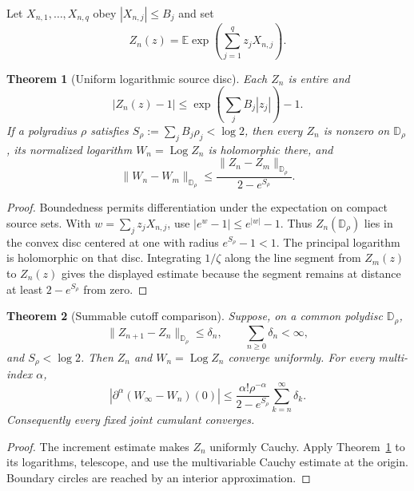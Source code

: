 \documentclass[11pt]{article}
\newtheorem{theorem}{Theorem}
\theoremstyle{definition}
\theoremstyle{remark}
\newcommand{\D}{\mathbb D}
\newcommand{\E}{\mathbb E}
\newcommand{\Log}{\operatorname{Log}}
\begin{document}
Let $X_{n,1},\ldots,X_{n,q}$ obey $|X_{n,j}|\le B_j$ and set
\[
 Z_n(z)=\E\exp\left(\sum_{j=1}^qz_jX_{n,j}\right).
\]

\begin{theorem}[Uniform logarithmic source disc]\label{thm:bounded}
Each $Z_n$ is entire and
\[
 |Z_n(z)-1|\le
 \exp\left(\sum_jB_j|z_j|\right)-1.
\]
If a polyradius $\rho$ satisfies $S_\rho:=\sum_jB_j\rho_j<\log2$, then every
$Z_n$ is nonzero on $\D_\rho$, its normalized logarithm $W_n=\Log Z_n$ is
holomorphic there, and
\[
 \lVert W_n-W_m\rVert_{\D_\rho}
 \le\frac{\lVert Z_n-Z_m\rVert_{\D_\rho}}
              {2-e^{S_\rho}}.
\]
\end{theorem}

\begin{proof}
Boundedness permits differentiation under the expectation on compact source
sets.  With $w=\sum_jz_jX_{n,j}$, use
$|e^w-1|\le e^{|w|}-1$.  Thus $Z_n(\D_\rho)$ lies in the convex disc centered
at one with radius $e^{S_\rho}-1<1$.  The principal logarithm is holomorphic on
that disc.  Integrating $1/\zeta$ along the line segment from $Z_m(z)$ to
$Z_n(z)$ gives the displayed estimate because the segment remains at distance
at least $2-e^{S_\rho}$ from zero.
\end{proof}

\begin{theorem}[Summable cutoff comparison]\label{thm:analytic}
Suppose, on a common polydisc $\D_\rho$,
\[
 \lVert Z_{n+1}-Z_n\rVert_{\D_\rho}\le\delta_n,
 \qquad \sum_{n\ge0}\delta_n<\infty,
\]
and $S_\rho<\log2$.  Then $Z_n$ and $W_n=\Log Z_n$ converge uniformly.
For every multi-index $\alpha$,
\[
 \left|\partial^\alpha(W_\infty-W_n)(0)\right|
 \le \frac{\alpha!\rho^{-\alpha}}{2-e^{S_\rho}}
       \sum_{k=n}^{\infty}\delta_k.
\]
Consequently every fixed joint cumulant converges.
\end{theorem}

\begin{proof}
The increment estimate makes $Z_n$ uniformly Cauchy.  Apply
Theorem~\ref{thm:bounded} to its logarithms, telescope, and use the
multivariable Cauchy estimate at the origin.  Boundary circles are reached by an
interior approximation.
\end{proof}
\end{document}
